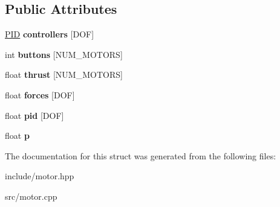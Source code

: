 \subsection*{Public Attributes}
\begin{DoxyCompactItemize}
\item 
\mbox{\label{structMotors_a7cbe4b9467412e4882ff318b9375017e}} 
\hyperlink{structPID}{P\+ID} {\bfseries controllers} \mbox{[}D\+OF\mbox{]}
\item 
\mbox{\label{structMotors_a84b2ea1a929743410df7ead8212b767a}} 
int {\bfseries buttons} \mbox{[}N\+U\+M\+\_\+\+M\+O\+T\+O\+RS\mbox{]}
\item 
\mbox{\label{structMotors_ac8d20987287ffda85eed109c3bf80a12}} 
float {\bfseries thrust} \mbox{[}N\+U\+M\+\_\+\+M\+O\+T\+O\+RS\mbox{]}
\item 
\mbox{\label{structMotors_a17cb9b1c3fc7749984c4622439901f84}} 
float {\bfseries forces} \mbox{[}D\+OF\mbox{]}
\item 
\mbox{\label{structMotors_a94c46cb5dab8c60c9fae75cc6b7af629}} 
float {\bfseries pid} \mbox{[}D\+OF\mbox{]}
\item 
\mbox{\label{structMotors_a46e39ac60edebef57fca46f878e2c0b5}} 
float {\bfseries p}
\end{DoxyCompactItemize}


The documentation for this struct was generated from the following files\+:\begin{DoxyCompactItemize}
\item 
include/motor.\+hpp\item 
src/motor.\+cpp\end{DoxyCompactItemize}
